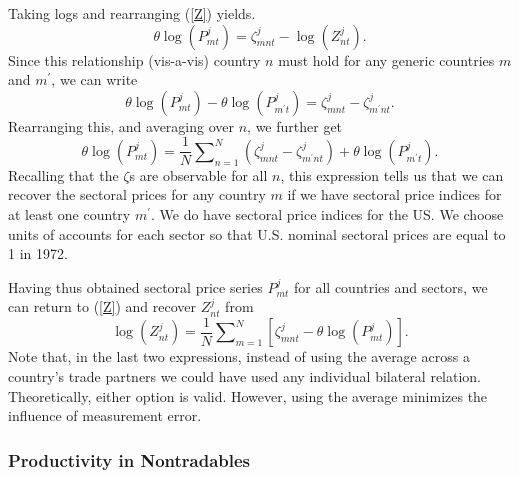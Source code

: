 \documentclass[12pt]{article}
\begin{document}
Taking logs and rearranging (\ref{Z}) yields.%
\begin{equation*}
\theta \log \left( P_{mt}^{j}\right) =\zeta _{mnt}^{j}-\log \left(
Z_{nt}^{j}\right) .
\end{equation*}%
Since this relationship (vis-a-vis) country $n$ must hold for any generic
countries $m$ and $m^{\prime }$, we can write%
\begin{equation*}
\theta \log \left( P_{mt}^{j}\right) -\theta \log \left( P_{m^{\prime
}t}^{j}\right) =\zeta _{mnt}^{j}-\zeta _{m^{\prime }nt}^{j}.
\end{equation*}%
Rearranging this, and averaging over $n$, we further get%
\begin{equation*}
\theta \log \left( P_{mt}^{j}\right) =\frac{1}{N}\sum\nolimits_{n=1}^{N}%
\left( \zeta _{mnt}^{j}-\zeta _{m^{\prime }nt}^{j}\right) +\theta \log
\left( P_{m^{\prime }t}^{j}\right) .
\end{equation*}%
Recalling that the $\zeta $s are observable for all $n$, this expression
tells us that we can recover the sectoral prices for any country $m$ if we
have sectoral price indices for at least one country $m^{\prime }$. We do
have sectoral price indices for the US. We choose units of accounts for each
sector so that U.S. nominal sectoral prices are equal to 1 in 1972.

Having thus obtained sectoral price series $P_{mt}^{j}$ for all countries
and sectors, we can return to (\ref{Z}) and recover $Z_{nt}^{j}$ from%
\begin{equation*}
\log (Z_{nt}^{j})=\frac{1}{N}\sum\nolimits_{m=1}^{N}\left[ \zeta
_{mnt}^{j}-\theta \log \left( P_{mt}^{j}\right) \right] .
\end{equation*}%
Note that, in the last two expressions, instead of using the average across
a country's trade partners we could have used any individual bilateral
relation. Theoretically, either option is valid. However, using the average
minimizes the influence of measurement error.

\subsubsection{\label{PNTS}Productivity in Nontradables}
\end{document}
